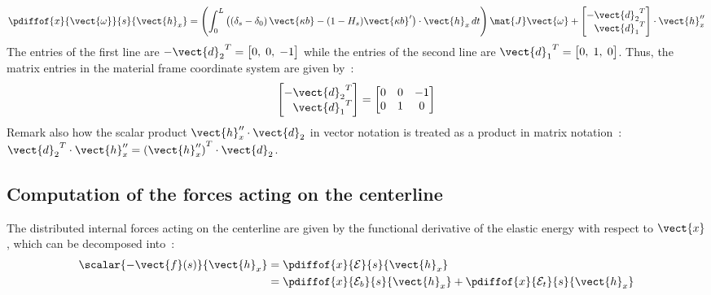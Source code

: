 \begin{equation}
			\pdiffof{x}{\vect{\omega}}{s}{\vect{h}_x}
	= 	\left(\int_0^L \left(\left(\delta_s-\delta_0\right)\vect{\kappa b} - (1-H_s)\vect{\kappa b}'\right)\cdot  \vect{h}_x \,dt\right)\mat{J}\vect{\omega}+
		\begin{bmatrix*}[r]
			-{\vect{d}_2}^T\\
			{\vect{d}_1}^T\\
		\end{bmatrix*}\cdot \vect{h}_x''
\label{eq:dwdx}
\end{equation}
The entries of the first line are $-{\vect{d}_2}^T = \begin{bmatrix} 0,\;0,\;-1 \end{bmatrix}$ while the entries of the second line are ${\vect{d}_1}^T = \begin{bmatrix} 0,\;1,\;0 \end{bmatrix}$. Thus, the matrix entries in the material frame coordinate system are given by~:
\begin{equation}
	\begin{bmatrix*}[r] -{\vect{d}_2}^T\\ {\vect{d}_1}^T \end{bmatrix*}
	=
	\begin{bmatrix} 0 & 0 & -1 \\ 0 & 1 & 0 \end{bmatrix}
\end{equation}
Remark also how the scalar product $\vect{h}_x''\cdot\vect{d}_2$ in vector notation is treated as a product in matrix notation~: ${\vect{d}_2}^T \cdot \vect{h}_x'' =  {(\vect{h}_x'')}^T \cdot {\vect{d}_2}$.

\subsection{Computation of the forces acting on the centerline}
The distributed internal forces acting on the centerline are given by the functional derivative of the elastic energy with respect to $\vect{x}$, which can be decomposed into~:
\begin{equation}
	\begin{aligned}
	\scalar{-\vect{f}(s)}{\vect{h}_x}
	&= \pdiffof{x}{\mathcal{E}}{s}{\vect{h}_x} \\
	&= \pdiffof{x}{\mathcal{E}_b}{s}{\vect{h}_x} + \pdiffof{x}{\mathcal{E}_t}{s}{\vect{h}_x} \\
	\end{aligned}
\label{eq:dEdx_def}
\end{equation}

